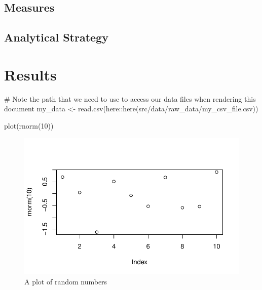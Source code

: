 \documentclass[
  super,
  preprint,
  3p]{elsarticle}
\newenvironment{Shaded}{\begin{snugshade}}{\end{snugshade}}
\newcommand{\CommentTok}[1]{\textcolor[rgb]{0.37,0.37,0.37}{#1}}
\newcommand{\DecValTok}[1]{\textcolor[rgb]{0.68,0.00,0.00}{#1}}
\newcommand{\FunctionTok}[1]{\textcolor[rgb]{0.28,0.35,0.67}{#1}}
\newcommand{\NormalTok}[1]{\textcolor[rgb]{0.00,0.23,0.31}{#1}}
\newcommand{\OtherTok}[1]{\textcolor[rgb]{0.00,0.23,0.31}{#1}}
\newcommand{\SpecialCharTok}[1]{\textcolor[rgb]{0.37,0.37,0.37}{#1}}
\newcommand{\StringTok}[1]{\textcolor[rgb]{0.13,0.47,0.30}{#1}}
\begin{document}
\hypertarget{measures}{%
\subsection{Measures}\label{measures}}

\hypertarget{analytical-strategy}{%
\subsection{Analytical Strategy}\label{analytical-strategy}}

\hypertarget{results-1}{%
\section{Results}\label{results-1}}

\begin{Shaded}
\begin{Highlighting}[]
\CommentTok{\# Note the path that we need to use to access our data files when rendering this document}
\NormalTok{my\_data }\OtherTok{\textless{}{-}} \FunctionTok{read.csv}\NormalTok{(here}\SpecialCharTok{::}\FunctionTok{here}\NormalTok{(}\StringTok{\textquotesingle{}src/data/raw\_data/my\_csv\_file.csv\textquotesingle{}}\NormalTok{))}
\end{Highlighting}
\end{Shaded}

\begin{Shaded}
\begin{Highlighting}[]
\FunctionTok{plot}\NormalTok{(}\FunctionTok{rnorm}\NormalTok{(}\DecValTok{10}\NormalTok{))}
\end{Highlighting}
\end{Shaded}

\begin{figure}[H]

{\centering \includegraphics{index_files/figure-pdf/fig-demo-plot-1.pdf}

}

\caption{\label{fig-demo-plot}A plot of random numbers}

\end{figure}
\end{document}
